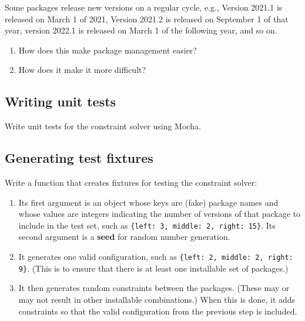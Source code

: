 \documentclass[krantzl]{krantz}
\newcommand{\glossref}[1]{\textbf{#1}}
\begin{document}
Some packages release new versions on a regular cycle,
e.g.,
Version 2021.1 is released on March 1 of 2021,
Version 2021.2 is released on September 1 of that year,
version 2022.1 is released on March 1 of the following year,
and so on.

\begin{enumerate}

\item 

How does this make package management easier?



\item 

How does it make it more difficult?



\end{enumerate}

\subsection*{Writing unit tests}


Write unit tests for the constraint solver using Mocha.

\subsection*{Generating test fixtures}


Write a function that creates fixtures for testing the constraint solver:

\begin{enumerate}

\item 

Its first argument is an object whose keys are (fake) package names
    and whose values are integers indicating the number of versions of that package
    to include in the test set,
    such as \texttt{\{{\textquotesingle}left{\textquotesingle}: 3, {\textquotesingle}middle{\textquotesingle}: 2, {\textquotesingle}right{\textquotesingle}: 15\}}.
    Its second argument is a \glossref{seed} for random number generation.



\item 

It generates one valid configuration,
    such as \texttt{\{{\textquotesingle}left{\textquotesingle}: 2, {\textquotesingle}middle{\textquotesingle}: 2, {\textquotesingle}right{\textquotesingle}: 9\}}.
    (This is to ensure that there is at least one installable set of packages.)



\item 

It then generates random constraints between the packages.
    (These may or may not result in other installable combinations.)
    When this is done,
    it adds constraints so that the valid configuration from the previous step is included.



\end{enumerate}
\end{document}
